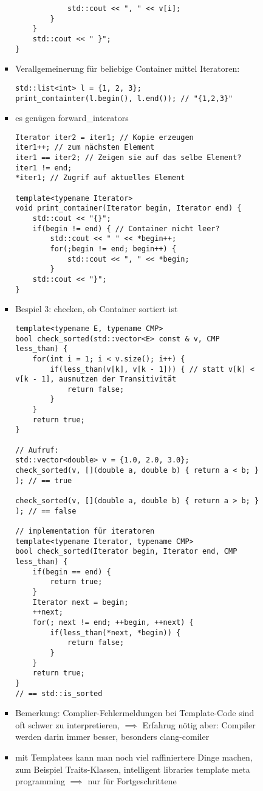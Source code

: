 \documentclass[a4paper]{scrartcl}
\theoremstyle{definition}
\theoremstyle{plain}
\theoremstyle{remark}
\theoremstyle{remark}
\begin{document}
\begin{itemize}
\begin{enumerate}
\begin{itemize}
\begin{itemize}
\begin{verbatim}
			std::cout << ", " << v[i];
		}
	}
	std::cout << " }";
}
\end{verbatim}
\item Verallgemeinerung für beliebige Container mittel Iteratoren:
\begin{verbatim}
std::list<int> l = {1, 2, 3};
print_containter(l.begin(), l.end()); // "{1,2,3}"
\end{verbatim}
\item es genügen forward\_interators
\begin{verbatim}
Iterator iter2 = iter1; // Kopie erzeugen
iter1++; // zum nächsten Element
iter1 == iter2; // Zeigen sie auf das selbe Element?
iter1 != end;
*iter1; // Zugrif auf aktuelles Element

template<typename Iterator>
void print_container(Iterator begin, Iterator end) {
	std::cout << "{}";
	if(begin != end) { // Container nicht leer?
		std::cout << " " << *begin++;
		for(;begin != end; begin++) {
			std::cout << ", " << *begin;
		}
	std::cout << "}";
}
\end{verbatim}
\item Bespiel 3: checken, ob Container sortiert ist
\begin{verbatim}
template<typename E, typename CMP>
bool check_sorted(std::vector<E> const & v, CMP less_than) {
	for(int i = 1; i < v.size(); i++) {
		if(less_than(v[k], v[k - 1])) { // statt v[k] < v[k - 1], ausnutzen der Transitivität
			return false;
		}
	}
	return true;
}

// Aufruf:
std::vector<double> v = {1.0, 2.0, 3.0};
check_sorted(v, [](double a, double b) { return a < b; } ); // == true

check_sorted(v, [](double a, double b) { return a > b; } ); // == false

// implementation für iteratoren
template<typename Iterator, typename CMP>
bool check_sorted(Iterator begin, Iterator end, CMP less_than) {
	if(begin == end) {
		return true;
	}
	Iterator next = begin;
	++next;
	for(; next != end; ++begin, ++next) {
		if(less_than(*next, *begin)) {
			return false;
		}
	}
	return true;
}
// == std::is_sorted
\end{verbatim}
\item Bemerkung: Complier-Fehlermeldungen bei Template-Code sind oft schwer zu interpretieren, $\implies$ Erfahrug nötig aber: Compiler werden darin immer besser, besonders clang-comiler
\item mit Templatees kann man noch viel raffiniertere Dinge machen, zum Beispiel Traits-Klassen, intelligent libraries template meta programming $\implies$ nur für Fortgeschrittene
\end{itemize}
\end{itemize}
\end{enumerate}
\end{itemize}
\end{document}
